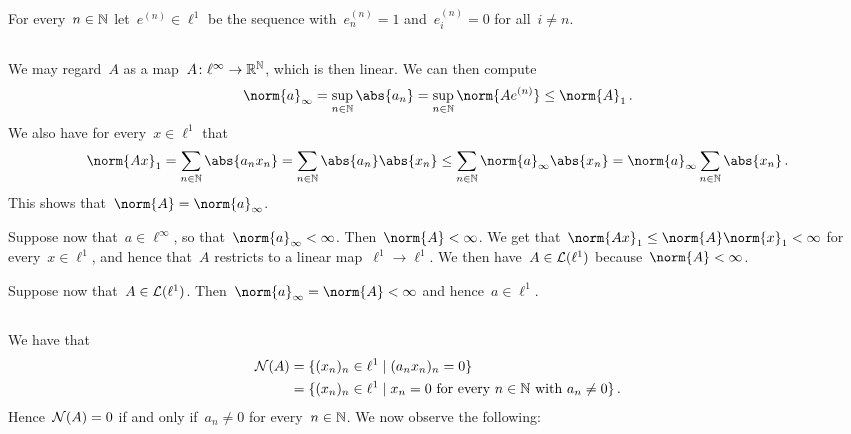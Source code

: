 \section{}

For every~$n \in \mathbb{N}$ let~$e^{(n)} \in \ell^1$ be the sequence with~$e^{(n)}_n = 1$ and~$e^{(n)}_i = 0$ for all~$i \neq n$.





\subsection{}

We may regard~$A$ as a map~$A \colon \ell^\infty \to \mathbb{R}^{\mathbb{N}}$, which is then linear.
We can then compute
\[
        \norm{a}_\infty
  =     \sup_{n \in \Natural} \abs{a_n}
  =     \sup_{n \in \Natural} \norm{A e^{(n)}}
  \leq  \norm{A}_1 \,.
\]
We also have for every~$x \in \ell^1$ that
\[
        \norm{Ax}_1
  =     \sum_{n \in \Natural} \abs{a_n x_n}
  =     \sum_{n \in \Natural} \abs{a_n} \abs{x_n}
  \leq  \sum_{n \in \Natural} \norm{a}_\infty \abs{x_n}
  =     \norm{a}_\infty \sum_{n \in \Natural} \abs{x_n} \,.
\]
This shows that~$\norm{A} = \norm{a}_\infty$.

Suppose now that~$a \in \ell^\infty$, so that~$\norm{a}_\infty < \infty$.
Then~$\norm{A} < \infty$.
We get that~$\norm{Ax}_1 \leq \norm{A} \norm{x}_1 < \infty$ for every~$x \in \ell^1$, and hence that~$A$ restricts to a linear map~$\ell^1 \to \ell^1$.
We then have~$A \in \mathcal{L}(\ell^1)$ because~$\norm{A} < \infty$.

Suppose now that~$A \in \mathcal{L}(\ell^1)$.
Then~$\norm{a}_\infty = \norm{A} < \infty$ and hence~$a \in \ell^1$.





\subsection{}

We have that
\begin{align*}
      \Null(A)
  &=  \{
        (x_n)_n \in \ell^1
      \suchthat
        (a_n x_n)_n = 0
      \}  \\
  &=  \{
        (x_n)_n \in \ell^1
      \suchthat
        \text{$x_n = 0$ for every~$n \in \Natural$ with~$a_n \neq 0$}
      \} \,.
\end{align*}
Hence~$\mathcal{N}(A) = 0$ if and only if~$a_n \neq 0$ for every~$n \in \mathbb{N}$.
We now observe the following:

